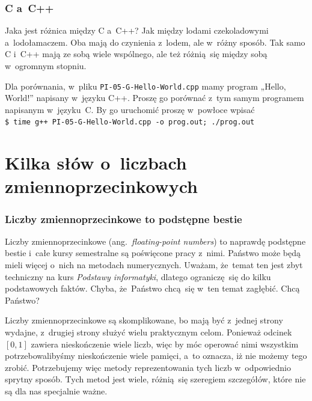 \documentclass[10pt,t]{beamer}
\begin{document}
\begin{frame}
  \frametitle{C a~C++}


  Jaka jest różnica między C a~C++? Jak między lodami czekoladowymi
  a~lodołamaczem. Oba mają do czynienia z~lodem, ale w~różny sposób.
  Tak samo C i~C++ mają ze sobą wiele wspólnego, ale też różnią~się między
  sobą w~ogromnym stopniu.

  Dla porównania, w~pliku \texttt{PI-05-G-Hello-World.cpp} mamy program
  „Hello, World!” napisany w~języku C++. Proszę go porównać z~tym samym
  programem napisanym w~języku~C. By go uruchomić proszę w~powłoce wpisać \\
  \texttt{\$ time g++ PI-05-G-Hello-World.cpp -o prog.out; ./prog.out}

\end{frame}










\section{Kilka słów o~liczbach zmiennoprzecinkowych}


\begin{frame}
  \frametitle{Liczby zmiennoprzecinkowe to podstępne bestie}


  Liczby zmiennoprzecinkowe (ang.~\textit{floating-point numbers}) to
  naprawdę podstępne bestie i~całe kursy semestralne są poświęcone
  pracy z~nimi. Państwo może będą mieli więcej o~nich na metodach
  numerycznych. Uważam, że~temat ten jest zbyt techniczny na kurs
  \textit{Podstawy informatyki}, dlatego ograniczę~się do kilku podstawowych
  faktów. Chyba, że~Państwo chcą~się w~ten temat zagłębić. Chcą Państwo?

  Liczby zmiennoprzecinkowe są skomplikowane, bo mają być z~jednej strony
  wydajne, z~drugiej strony służyć wielu praktycznym celom. Ponieważ
  odcinek $[ 0, 1 ]$ zawiera nieskończenie wiele liczb, więc by móc operować
  nimi wszystkim potrzebowalibyśmy nieskończenie wiele pamięci, a~to oznacza,
  iż nie możemy tego zrobić. Potrzebujemy więc metody reprezentowania tych
  liczb w~odpowiednio sprytny sposób. Tych metod jest wiele, różnią~się
  szeregiem szczegółów, które nie są dla nas specjalnie ważne.

\end{frame}
\end{document}
